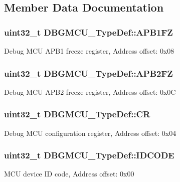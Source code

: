 \subsection{Member Data Documentation}
\hypertarget{struct_d_b_g_m_c_u___type_def_aac341c7e09cd5224327eeb7d9f122bed}{
\subsubsection[{A\-P\-B1\-F\-Z}]{ uint32\-\_\-t D\-B\-G\-M\-C\-U\-\_\-\-Type\-Def\-::\-A\-P\-B1\-F\-Z}}\label{struct_d_b_g_m_c_u___type_def_aac341c7e09cd5224327eeb7d9f122bed}
Debug M\-C\-U A\-P\-B1 freeze register, Address offset\-: 0x08 \hypertarget{struct_d_b_g_m_c_u___type_def_a011f892d86367dbe786964b14bc515a6}{
\subsubsection[{A\-P\-B2\-F\-Z}]{ uint32\-\_\-t D\-B\-G\-M\-C\-U\-\_\-\-Type\-Def\-::\-A\-P\-B2\-F\-Z}}\label{struct_d_b_g_m_c_u___type_def_a011f892d86367dbe786964b14bc515a6}
Debug M\-C\-U A\-P\-B2 freeze register, Address offset\-: 0x0\-C \hypertarget{struct_d_b_g_m_c_u___type_def_a15981828f2b915d38570cf6684e99a53}{
\subsubsection[{C\-R}]{ uint32\-\_\-t D\-B\-G\-M\-C\-U\-\_\-\-Type\-Def\-::\-C\-R}}\label{struct_d_b_g_m_c_u___type_def_a15981828f2b915d38570cf6684e99a53}
Debug M\-C\-U configuration register, Address offset\-: 0x04 \hypertarget{struct_d_b_g_m_c_u___type_def_a0cc3561c124d06bb57dfa855e43ed99f}{
\subsubsection[{I\-D\-C\-O\-D\-E}]{ uint32\-\_\-t D\-B\-G\-M\-C\-U\-\_\-\-Type\-Def\-::\-I\-D\-C\-O\-D\-E}}\label{struct_d_b_g_m_c_u___type_def_a0cc3561c124d06bb57dfa855e43ed99f}
M\-C\-U device I\-D code, Address offset\-: 0x00 

